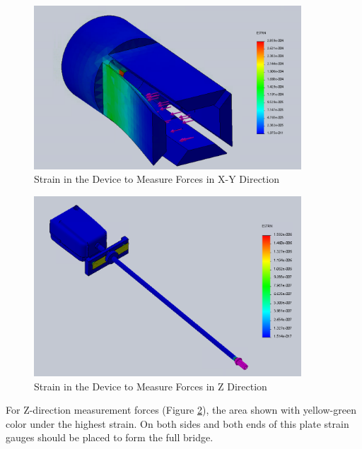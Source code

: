 \begin{figure}[h]
	\begin{center}
		\includegraphics[width=100mm]{fig/methods/old_sleeve.png}
	\end{center}
	\vspace{-4mm}
	\caption[Strain in the Device to Measure Forces in X-Y Direction]
	{Strain in the Device to Measure Forces in X-Y Direction}
	\label{fig:XYdev}
	\vspace{-2mm}
\end{figure}


\begin{figure}[h]
	\begin{center}
		\includegraphics[width=100mm]{fig/methods/z_dir_sim.png}
	\end{center}
	\vspace{-4mm}
	\caption[Strain in the Device to Measure Forces in Z Direction]
	{Strain in the Device to Measure Forces in Z Direction}
	\label{fig:Zdev}
	\vspace{-2mm}
\end{figure}

For Z-direction measurement forces (Figure \ref{fig:Zdev}), the area shown with yellow-green color under the highest strain. On both sides and both ends of this plate strain gauges should be placed to form the full bridge.

